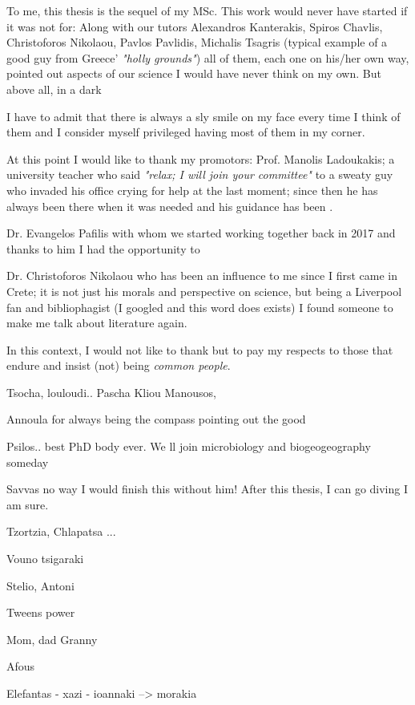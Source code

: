 \documentclass[master=elt, cleveref, autoref, masteroption=eg]{kulemt}
\begin{document}
\begin{preface}
   To me, this thesis is the sequel of my MSc. 
   This work would never have started if it was not for:
   Along with our tutors Alexandros Kanterakis, Spiros Chavlis, 
   Christoforos Nikolaou, 
   Pavlos Pavlidis, 
   Michalis Tsagris (typical example of a 
   good guy from Greece' \textit{"holly grounds"}) 
   all of them, each one on his/her own way, pointed out aspects of our science I would have never think on my own. 
   But above all, in a dark 

   I have to admit that there is always a sly smile on my face every time I think of them 
   and I consider myself privileged having most of them in my corner. 

   At this point I would like to thank my promotors: 
   Prof. Manolis Ladoukakis; a university teacher who said \textit{"relax; I will join your committee"} 
   to a sweaty guy who invaded his office crying for help at the last moment; 
   since then he has always been there when it was needed and his guidance has been . 

   Dr. Evangelos Pafilis with whom we started working together back in 2017 
   and thanks to him I had the opportunity to

   Dr. Christoforos Nikolaou who has been an influence to me since I first came in Crete; 
   it is not just his morals and perspective on science, but being a Liverpool fan and bibliophagist 
   (I googled and this word does exists)
   I found someone to make me talk about literature again. 



   In this context, I would not like to thank but to pay my respects to those that endure 
   and insist (not) being \textit{common people}.

   Tsocha, louloudi.. 
   Pascha 
   Kliou 
   Manousos, 
  
   Annoula for always being the compass pointing out the good 

   Psilos.. best PhD body ever. We ll join microbiology and biogeogeography someday 

   Savvas no way I would finish this without him! After this thesis, I can go diving I am sure. 
   
   Tzortzia, Chlapatsa ... 

   Vouno tsigaraki 

   Stelio, Antoni

   Tweens power 

   Mom, dad 
   Granny 


   Afous 


   Elefantas - xazi - ioannaki --> morakia  
  
\end{preface}
\fi
\end{document}
